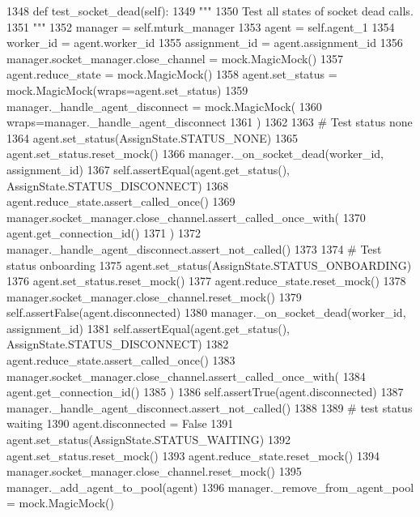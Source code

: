 \begin{DoxyCode}
1348     \textcolor{keyword}{def }test\_socket\_dead(self):
1349         \textcolor{stringliteral}{"""}
1350 \textcolor{stringliteral}{        Test all states of socket dead calls.}
1351 \textcolor{stringliteral}{        """}
1352         manager = self.mturk\_manager
1353         agent = self.agent\_1
1354         worker\_id = agent.worker\_id
1355         assignment\_id = agent.assignment\_id
1356         manager.socket\_manager.close\_channel = mock.MagicMock()
1357         agent.reduce\_state = mock.MagicMock()
1358         agent.set\_status = mock.MagicMock(wraps=agent.set\_status)
1359         manager.\_handle\_agent\_disconnect = mock.MagicMock(
1360             wraps=manager.\_handle\_agent\_disconnect
1361         )
1362 
1363         \textcolor{comment}{# Test status none}
1364         agent.set\_status(AssignState.STATUS\_NONE)
1365         agent.set\_status.reset\_mock()
1366         manager.\_on\_socket\_dead(worker\_id, assignment\_id)
1367         self.assertEqual(agent.get\_status(), AssignState.STATUS\_DISCONNECT)
1368         agent.reduce\_state.assert\_called\_once()
1369         manager.socket\_manager.close\_channel.assert\_called\_once\_with(
1370             agent.get\_connection\_id()
1371         )
1372         manager.\_handle\_agent\_disconnect.assert\_not\_called()
1373 
1374         \textcolor{comment}{# Test status onboarding}
1375         agent.set\_status(AssignState.STATUS\_ONBOARDING)
1376         agent.set\_status.reset\_mock()
1377         agent.reduce\_state.reset\_mock()
1378         manager.socket\_manager.close\_channel.reset\_mock()
1379         self.assertFalse(agent.disconnected)
1380         manager.\_on\_socket\_dead(worker\_id, assignment\_id)
1381         self.assertEqual(agent.get\_status(), AssignState.STATUS\_DISCONNECT)
1382         agent.reduce\_state.assert\_called\_once()
1383         manager.socket\_manager.close\_channel.assert\_called\_once\_with(
1384             agent.get\_connection\_id()
1385         )
1386         self.assertTrue(agent.disconnected)
1387         manager.\_handle\_agent\_disconnect.assert\_not\_called()
1388 
1389         \textcolor{comment}{# test status waiting}
1390         agent.disconnected = \textcolor{keyword}{False}
1391         agent.set\_status(AssignState.STATUS\_WAITING)
1392         agent.set\_status.reset\_mock()
1393         agent.reduce\_state.reset\_mock()
1394         manager.socket\_manager.close\_channel.reset\_mock()
1395         manager.\_add\_agent\_to\_pool(agent)
1396         manager.\_remove\_from\_agent\_pool = mock.MagicMock()

\end{DoxyCode}
